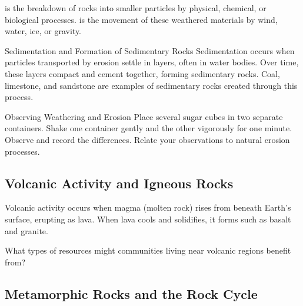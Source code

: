  is the breakdown of rocks into smaller particles by physical, chemical, or biological processes.  is the movement of these weathered materials by wind, water, ice, or gravity.

\begin{keyconcept}{Sedimentation and Formation of Sedimentary Rocks}
Sedimentation occurs when particles transported by erosion settle in layers, often in water bodies. Over time, these layers compact and cement together, forming sedimentary rocks. Coal, limestone, and sandstone are examples of sedimentary rocks created through this process.
\end{keyconcept}

\begin{investigation}{Observing Weathering and Erosion}
Place several sugar cubes in two separate containers. Shake one container gently and the other vigorously for one minute. Observe and record the differences. Relate your observations to natural erosion processes.
\end{investigation}

\subsection{Volcanic Activity and Igneous Rocks}

Volcanic activity occurs when magma (molten rock) rises from beneath Earth's surface, erupting as lava. When lava cools and solidifies, it forms  such as basalt and granite.


\begin{marginfigure}
\caption{Formation of igneous rocks through volcanic activity.}
\end{marginfigure}

\begin{stopandthink}
What types of resources might communities living near volcanic regions benefit from?
\end{stopandthink}

\subsection{Metamorphic Rocks and the Rock Cycle}

